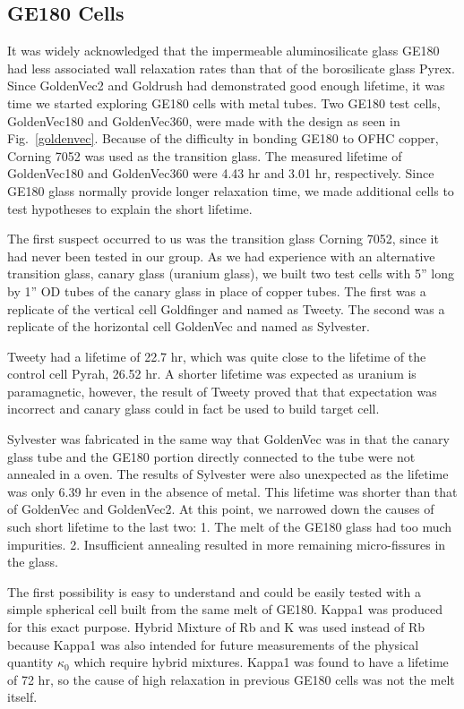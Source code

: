 \subsection{GE180 Cells}

It was widely acknowledged that the impermeable aluminosilicate glass GE180 had less associated wall relaxation rates than that of the borosilicate glass Pyrex. Since GoldenVec2 and Goldrush had demonstrated good enough lifetime, it was time we started exploring GE180 cells with metal tubes. Two GE180 test cells, GoldenVec180 and GoldenVec360, were made with the design as seen in Fig.~\ref{goldenvec}. Because of the difficulty in bonding GE180 to OFHC copper, Corning 7052 was used as the transition glass. The measured lifetime of GoldenVec180 and GoldenVec360 were 4.43 hr and 3.01 hr, respectively. Since GE180 glass normally provide longer relaxation time, we made additional cells to test hypotheses to explain the short lifetime.

The first suspect occurred to us was the transition glass Corning 7052, since it had never been tested in our group. As we had experience with an alternative transition glass, canary glass (uranium glass), we built two test cells with 5'' long by 1'' OD  tubes of the canary glass in place of copper tubes. The first was a replicate of the vertical cell Goldfinger and named as Tweety. The second was a replicate of the horizontal cell GoldenVec and named as Sylvester.

Tweety had a lifetime of 22.7 hr, which was quite close to the lifetime of the control cell Pyrah, 26.52 hr. A shorter lifetime was expected as uranium is paramagnetic, however, the result of Tweety proved that that expectation was incorrect and canary glass could in fact be used to build target cell.

Sylvester was fabricated in the same way that GoldenVec was in that the canary glass tube and the GE180 portion directly connected to the tube were not annealed in a oven. The results of Sylvester were also unexpected as the lifetime was only 6.39 hr even in the absence of metal. This lifetime was shorter than that of GoldenVec and GoldenVec2. At this point, we narrowed down the causes of such short lifetime to the last two:
1. The melt of the GE180 glass had too much impurities.
2. Insufficient annealing resulted in more remaining micro-fissures in the glass.

The first possibility is easy to understand and could be easily tested with a simple spherical cell built from the same melt of GE180. Kappa1 was produced for this exact purpose. Hybrid Mixture of Rb and K was used instead of Rb because Kappa1 was also intended for future measurements of the physical quantity $\kappa_0$ which require hybrid mixtures. Kappa1 was found to have a lifetime of 72 hr, so the cause of high relaxation in previous GE180 cells was not the melt itself.

